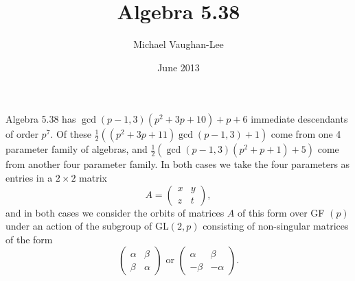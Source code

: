 \documentclass[12pt]{article}
\begin{document}
\title{Algebra 5.38}
\author{Michael Vaughan-Lee}
\date{June 2013}
\maketitle

Algebra 5.38 has$\allowbreak $ $\gcd (p-1,3)(p^{2}+3p+10)+p+6$ immediate
descendants of order $p^{7}$. Of these $\frac{1}{2}((p^{2}+3p+11)\gcd
(p-1,3)+1)$ come from one 4 parameter family of algebras, and $\frac{1}{2}%
(\gcd (p-1,3)(p^{2}+p+1)+5)$ come from another four parameter family. In
both cases we take the four parameters as entries in a $2\times 2$ matrix%
\[
A=\left( 
\begin{array}{cc}
x & y \\ 
z & t%
\end{array}%
\right) , 
\]%
and in both cases we consider the orbits of matrices $A$ of this form over GF%
$(p)$ under an action of the subgroup of GL$(2,p)$ consisting of
non-singular matrices of the form%
\[
\left( 
\begin{array}{ll}
\alpha & \beta \\ 
\beta & \alpha%
\end{array}%
\right) \text{ or }\left( 
\begin{array}{ll}
\alpha & \beta \\ 
-\beta & -\alpha%
\end{array}%
\right) . 
\]
\end{document}

